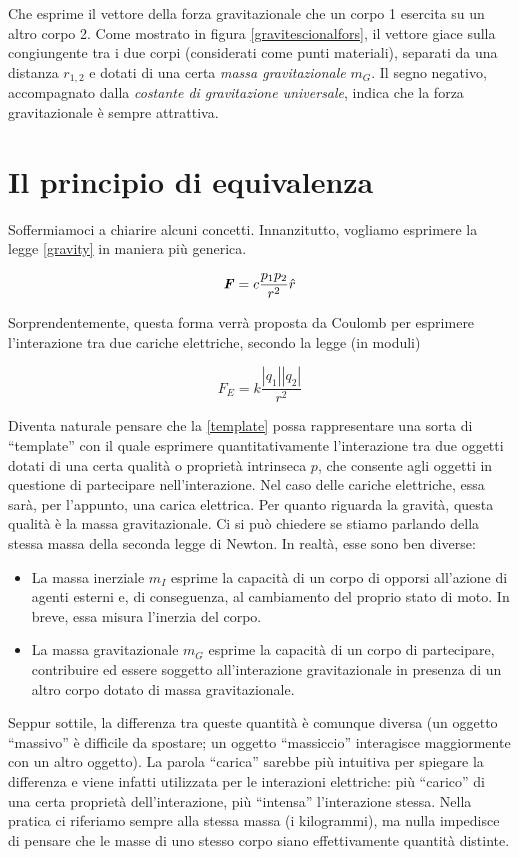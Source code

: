 \noindent Che esprime il vettore della forza gravitazionale che un corpo 1 esercita su un
altro corpo 2. Come mostrato in figura \ref{gravitescionalfors}, il vettore giace sulla congiungente tra i due corpi (considerati come
punti materiali), separati da una distanza $r_{1,2}$ e dotati di una certa
\textit{massa gravitazionale} $m_G$. Il segno negativo, accompagnato dalla
\textit{costante di gravitazione universale}, indica che la forza gravitazionale è
sempre attrattiva.

\section{Il principio di equivalenza}
Soffermiamoci a chiarire alcuni concetti. Innanzitutto, vogliamo esprimere la legge
\ref{gravity} in maniera più generica.

\begin{align}
    \textbf{\textit{F}} = c\frac{p_1p_2}{r^2}\hat{r} \label{template}
\end{align}

\noindent Sorprendentemente, questa forma verrà proposta da Coulomb per esprimere
l'interazione tra due cariche elettriche, secondo la legge (in moduli)

\[ F_E = k\frac{|q_1||q_2|}{r^2} \]

\noindent Diventa naturale pensare che la \ref{template} possa rappresentare una
sorta di ``template'' con il quale esprimere quantitativamente l'interazione tra due
oggetti dotati di una certa qualità o proprietà intrinseca $p$, che consente agli oggetti in
questione di partecipare nell'interazione. Nel caso delle cariche elettriche,
essa sarà, per l'appunto, una carica elettrica. Per quanto riguarda la gravità,
questa qualità è la massa gravitazionale. Ci si può chiedere se stiamo parlando
della stessa massa della seconda legge di Newton. In realtà, esse sono ben diverse:
\begin{itemize}
    \item La massa inerziale $m_I$ esprime la capacità di un corpo di opporsi all'azione
    di agenti esterni e, di conseguenza, al cambiamento del proprio stato di moto.
    In breve, essa misura l'inerzia del corpo.

    \item La massa gravitazionale $m_G$ esprime la capacità di un corpo di partecipare,
    contribuire ed essere soggetto all'interazione gravitazionale in presenza di
    un altro corpo dotato di massa gravitazionale.
\end{itemize}
Seppur sottile, la differenza tra queste quantità è
comunque diversa (un oggetto ``massivo'' è difficile da spostare; un oggetto ``massiccio''
interagisce maggiormente con un altro oggetto). La parola ``carica'' sarebbe più intuitiva per spiegare la differenza
e viene infatti utilizzata per le interazioni elettriche: più ``carico'' di una certa
proprietà dell'interazione, più ``intensa'' l'interazione stessa. Nella pratica ci
riferiamo sempre alla stessa massa (i kilogrammi), ma nulla impedisce di pensare che le masse di
uno stesso corpo siano effettivamente quantità distinte.

